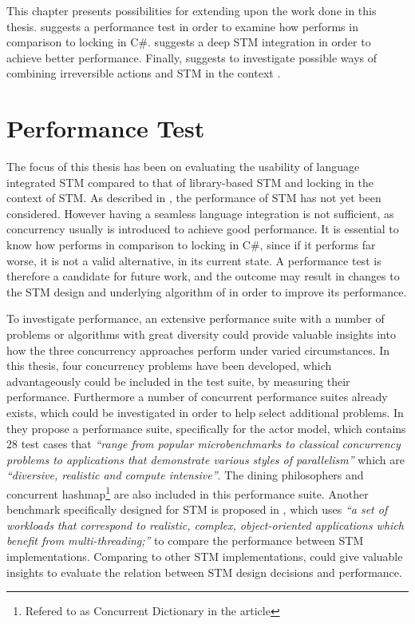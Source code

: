 \makeatletter {}\makeatother
{}
This chapter presents possibilities for extending upon the work done in this thesis.  suggests a performance test in order to examine how \stmname performs in comparison to locking in C\#.  suggests a deep \ac{STM} integration in order to achieve better performance. Finally,  suggests to investigate possible ways of combining  irreversible actions and \ac{STM} in the context \stmname.

\label{chap:future_work}
\section{Performance Test}\label{sec:fut_perf_test}
The focus of this thesis has been on evaluating the usability of language integrated \ac{STM} compared to that of library-based \ac{STM} and locking in the context of \ac{STM}. As described in , the performance of \ac{STM} has not yet been considered. However having a seamless language integration is not sufficient, as concurrency usually is introduced to achieve good performance. It is essential to know how \stmname performs in comparison to locking in C\#, since if it performs far worse, it is not a valid alternative, in its current state. A performance test is therefore a candidate for future work, and the outcome may result in changes to the \ac{STM} design and underlying algorithm of \stmname in order to improve its performance.

To investigate performance, an extensive performance suite with a number of problems or algorithms with great diversity could provide valuable insights into how the three concurrency approaches perform under varied circumstances. In this thesis, four concurrency problems have been developed, which advantageously could be included in the test suite, by measuring their performance. Furthermore a number of concurrent performance suites already exists, which could be investigated in order to help select additional problems. In \cite{imam2014savina} they propose a performance suite, specifically for the actor model, which contains 28 test cases that \textit{``range from popular microbenchmarks to classical concurrency problems to applications that demonstrate various styles of parallelism''} which are \textit{``diversive, realistic and compute intensive''}. The dining philosophers and concurrent hashmap\footnote{Refered to as Concurrent Dictionary in the article} are also included in this performance suite. Another benchmark specifically designed for \ac{STM} is proposed in \cite{guerraoui2006stmbench7}, which uses \textit{``a set of workloads that correspond to realistic, complex, object-oriented applications which benefit from multi-threading;''} to compare the performance between \ac{STM} implementations. Comparing \stmname to other \ac{STM} implementations, could give valuable insights to evaluate the relation between \ac{STM} design decisions and performance.


